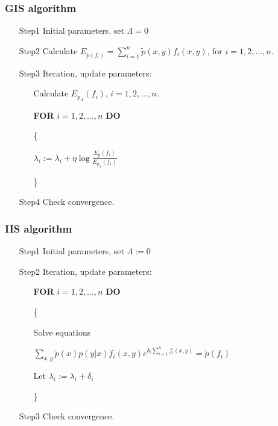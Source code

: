 \documentclass[slidestop,compress,mathserif]{beamer}
\begin{document}
	\begin{frame}
		\frametitle{GIS algorithm}
		\begin{itemize}
			\item[Step1] Initial parameters. set $\Lambda = 0$
			\item[Step2] Calculate $E_{\widetilde{p}(f_i)} = \sum_{i=1}^{n}\widetilde{p}(x,y)f_i(x,y)$, for $i=1,2,\ldots,n.$
			\item[Step3] Iteration, update parameters:
			\begin{itemize}
				\item[] Calculate $E_{p_{\Lambda}}(f_i)$, $i=1,2,\ldots,n$.
				\item[] \textbf{FOR} $i=1,2,\ldots,n$ \textbf{DO}
				\item[] \{
				\item[] $\lambda_i := \lambda_i + \eta\log\frac{E_{\widetilde{p}}(f_i)}{E_{p_{\Lambda}}(f_i)}$
				\item[] \}
			\end{itemize}
			\item[Step4] Check convergence.
		\end{itemize} 	
	\end{frame}
	
	\begin{frame}
		\frametitle{IIS algorithm}
		\begin{itemize}
			\item[Step1] Initial parameters, set $\Lambda := 0$
			\item[Step2] Iteration, update parameters:
			\begin{itemize}
				\item[] \textbf{FOR} $i=1,2,\ldots,n$ \textbf{DO}
				\item[] \{
				\item[] 	Solve equations
				\item[]    $\sum_{x,y}\widetilde{p}(x)p(y|x)f_i(x,y)e^{\delta_i\sum_{i=1}^{n}f_i(x,y)} = \widetilde{p}(f_i)$
				\item[] Let $\lambda_i := \lambda_i + \delta_i$
				\item[] \}
			\end{itemize}
			\item[Step3] Check convergence.
		\end{itemize}
	\end{frame}
	
\end{document}

